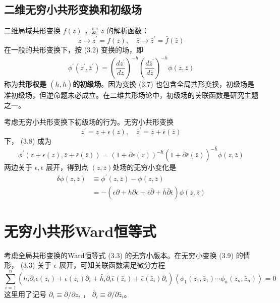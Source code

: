 \subsection{二维无穷小共形变换和初级场}

二维局域共形变换 $f(z)$ ，是 $z$ 的解析函数：
\begin{equation}
	z \rightarrow z^{\prime}=f(z), \quad \bar{z} \rightarrow \bar{z}^{\prime}=\bar{f}(\bar{z})
\end{equation}
在一般的共形变换下，按 (3.2) 变换的场，即
\begin{equation}
\phi^{\prime}\left(z^{\prime}, \bar{z}^{\prime}\right)=\left(\frac{d z^{\prime}}{d z}\right)^{-h}\left(\frac{d \bar{z}^{\prime}}{d \bar{z}}\right)^{-\bar{h}} \phi(z, \bar{z})
\end{equation}
称为\textbf{共形权是 $(h,\bar{h}) $的初级场}。因为变换 (3.7) 也包含全局共形变换，初级场是准初级场，但逆命题未必成立。在二维共形场论中，初级场的关联函数是研究主题之一。

考虑无穷小共形变换下初级场的行为。无穷小共形变换
\begin{equation}
z^{\prime}=z+\epsilon(z), \quad \bar{z}^{\prime}=\bar{z}+\bar{\epsilon}(\bar{z})
\end{equation}
下， (3.8) 成为
\begin{equation}
\phi^{\prime}(z+\epsilon(z), \bar{z}+\bar{\epsilon}(\bar{z}))=(1+\partial \epsilon(z))^{-h}(1+\bar{\partial} \bar{\epsilon}(\bar{z}))^{-\bar{h}} \phi(z, \bar{z})
\end{equation}
两边关于 $\epsilon,\bar{\epsilon}$ 展开，得到点 $(z,\bar{z}) $处场的无穷小变化是
\begin{equation}
\begin{aligned} \delta \phi(z, \bar{z}) & \equiv \phi^{\prime}(z, \bar{z})-\phi(z, \bar{z}) \\ &=-(\epsilon \partial+h \partial \epsilon+\bar{\epsilon} \bar{\partial}+\bar{h} \bar{\partial} \bar{\epsilon}) \phi(z, \bar{z}) \end{aligned}
\end{equation}

\section{无穷小共形Ward恒等式}

考虑全局共形变换的Ward恒等式 (3.3) 的无穷小版本。在无穷小变换 (3.9) 的情形， (3.3) 关于 $\epsilon$ 展开，可知关联函数满足微分方程
\begin{equation}
\sum_{i=1}^{n}\left(h_{i} \partial_{i} \epsilon\left(z_{i}\right)+\epsilon\left(z_{i}\right) \partial_{i}+\bar{h}_{i} \bar{\partial}_{i} \bar{\epsilon}\left(\bar{z}_{i}\right)+\bar{\epsilon}\left(\bar{z}_{i}\right) \bar{\partial}_{i}\right)\left\langle\phi_{1}\left(z_{1}, \bar{z}_{1}\right) \cdots \phi_{n}\left(z_{n}, \bar{z}_{n}\right)\right\rangle=0
\end{equation}
这里用了记号 $\partial_i\equiv \partial/\partial z_i$ ， $\bar{\partial}_i\equiv \partial/\partial \bar{z}_i $。

